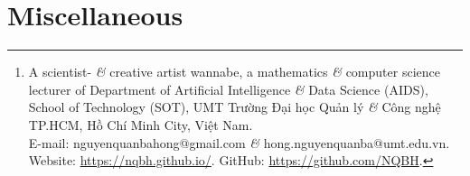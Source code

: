 \documentclass{article}
\title{}
\author{Nguyễn Quản Bá Hồng\footnote{A scientist- {\it\&} creative artist wannabe, a mathematics {\it\&} computer science lecturer of Department of Artificial Intelligence {\it\&} Data Science (AIDS), School of Technology (SOT), UMT Trường Đại học Quản lý {\it\&} Công nghệ TP.HCM, Hồ Chí Minh City, Việt Nam.\\E-mail: {\sf nguyenquanbahong@gmail.com} {\it\&} {\sf hong.nguyenquanba@umt.edu.vn}. Website: \url{https://nqbh.github.io/}. GitHub: \url{https://github.com/NQBH}.}}
\date{\today}
\begin{document}
\maketitle
\begin{abstract}
	This text is a part of the series {\it Some Topics in Advanced STEM \& Beyond}:
	
	{\sc url}: \url{https://nqbh.github.io/advanced_STEM/}.
	
	Latest version:
	\begin{itemize}
		\item {\it }.
		
		PDF: {\sc url}: \url{.pdf}.
		
		\TeX: {\sc url}: \url{.tex}.
		\item {\it }.
		
		PDF: {\sc url}: \url{.pdf}.
		
		\TeX: {\sc url}: \url{.tex}.
	\end{itemize}
\end{abstract}
\tableofcontents


\section{}


\section{Miscellaneous}


\printbibliography[heading=bibintoc]
\end{document}
